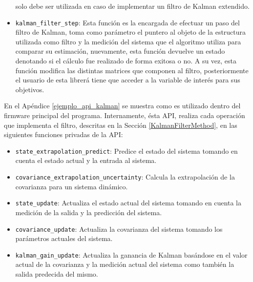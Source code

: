 \documentclass[10pt, a4paper]{article}
\newcounter{subsubsubsection}[subsubsection]
\begin{document}
\begin{itemize}
        solo debe ser utilizada en caso de implementar un filtro de Kalman
        extendido.
    \item \texttt{kalman\_filter\_step}: Esta funci\'on es la encargada de
        efectuar un paso del filtro de Kalman, toma como par\'ametro el puntero
        al objeto de la estructura utilizada como filtro y la medici\'on del 
        sistema que el algoritmo utiliza para comparar su estimaci\'on, 
        nuevamente, esta funci\'on devuelve un estado denotando si el c\'alculo 
        fue realizado de forma exitosa o no. A su vez, esta funci\'on modifica
        las distintas matrices que componen al filtro, posteriormente el usuario
        de esta librer\'a tiene que acceder a la variable de inter\'es para sus
        objetivos.
\end{itemize}

En el Ap\'endice \ref{ejemplo_api_kalman} se muestra como es utilizado dentro
del firmware principal del programa. Internamente, \'esta \acrshort{API},
realiza cada operaci\'on que implementa el filtro, descritas en la Secci\'on
\ref{KalmanFilterMethod}, en las siguientes funciones privadas de la
\acrshort{API}:

\begin{itemize}
    \item \texttt{state\_extrapolation\_predict}: Predice el estado del sistema
        tomando en cuenta el estado actual y la entrada al sistema.
    \item \texttt{covariance\_extrapolation\_uncertainty}: Calcula la
        extrapolaci\'on de la covarianza para un sistema din\'amico.
    \item \texttt{state\_update}: Actualiza el estado actual del sistema tomando
        en cuenta la medici\'on de la salida y la predicci\'on del sistema.
    \item \texttt{covariance\_update}: Actualiza la covarianza del sistema
        tomando los par\'ametros actuales del sistema.
    \item \texttt{kalman\_gain\_update}: Actualiza la ganancia de Kalman
        bas\'andose en el valor actual de la covarianza y la medici\'on actual
        del sistema como tambi\'en la salida predecida del mismo.
\end{itemize}

\end{document}
